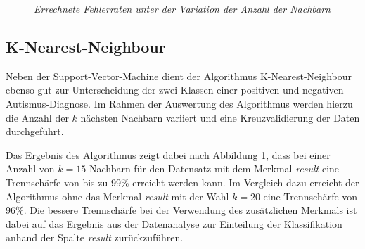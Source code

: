 \begin{figure}[h!]
\centering

\caption{\em Errechnete Fehlerraten unter der Variation der Anzahl der Nachbarn}
\label{fig:k_neighbours}
\end{figure}

\subsection{K-Nearest-Neighbour} \label{sec:kneighbour}
Neben der Support-Vector-Machine dient der Algorithmus K-Nearest-Neighbour ebenso gut zur Unterscheidung der zwei Klassen einer positiven und negativen Autismus-Diagnose. Im Rahmen der Auswertung des Algorithmus werden hierzu die Anzahl der $k$ nächsten Nachbarn variiert und eine Kreuzvalidierung der Daten durchgeführt.

Das Ergebnis des Algorithmus zeigt dabei nach Abbildung \ref{fig:k_neighbours}, dass bei einer Anzahl von $k=15$ Nachbarn für den Datensatz mit dem Merkmal \textit{result} eine Trennschärfe von bis zu 99\% erreicht werden kann. Im Vergleich dazu erreicht der Algorithmus ohne das Merkmal \textit{result} mit der Wahl $k=20$ eine Trennschärfe von 96\%. Die bessere Trennschärfe bei der Verwendung des zusätzlichen Merkmals ist dabei auf das Ergebnis aus der Datenanalyse zur Einteilung der Klassifikation anhand der Spalte \textit{result} zurückzuführen.
